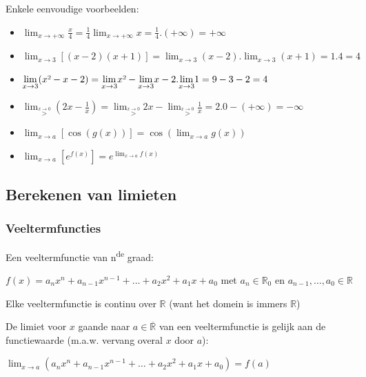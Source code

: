 Enkele eenvoudige voorbeelden:
\begin{itemize}
\item ${\displaystyle \lim_{x\to+\infty}}\frac{x}{4}=\frac{1}{4}{\displaystyle \lim_{x\to+\infty}}x=\frac{1}{4}.(+\infty)=+\infty$
\item ${\displaystyle \lim_{x\to3}}\left[(x-2)(x+1)\right]={\displaystyle \lim_{x\to3}}(x-2).{\displaystyle \lim_{x\to3}}(x+1)=1.4=4$
\item ${\displaystyle \lim_{x\to3}}(x\text{\texttwosuperior}-x-2)={\displaystyle \lim_{x\to3}}x\text{\texttwosuperior}-{\displaystyle \lim_{x\to3}}x-2.{\displaystyle \lim_{x\to3}}1=9-3-2=4$
\item ${\displaystyle \lim_{\overset{x\rightarrow0}{>}}}\left(2x-\frac{1}{x}\right)={\displaystyle \lim_{\overset{x\rightarrow0}{>}}}2x-{\displaystyle \lim_{\overset{x\rightarrow0}{>}}}\frac{1}{x}=2.0-\left(+\infty\right)=-\infty$
\item ${\displaystyle \lim_{x\to a}}\left[\cos\left(g(x)\right)\right]=\cos\left({\displaystyle \lim_{x\to a}}g(x)\right)$
\item ${\displaystyle \lim_{x\to a}}\left[e^{f(x)}\right]=e^{{\displaystyle \lim_{x\to a}}f(x)}$
\end{itemize}

\subsection{Berekenen van limieten}

\subsubsection{Veeltermfuncties}

Een veeltermfunctie van n\textsuperscript{de} graad:

$f(x)=a_{n}x^{n}+a_{n-1}x^{n-1}+\ldots+a_{2}x^{2}+a_{1}x+a_{0}$ met
$a_{n}\in\mathbb{R}_{0}$ en $a_{n-1},\ldots,a_{0}\in\mathbb{R}$




Elke veeltermfunctie is continu over $\mathbb{R}$ (want
het domein is immers $\mathbb{R}$)

De limiet voor $x$ gaande naar $a\in\overline{\mathbb{R}}$
van een veeltermfunctie is gelijk aan de functiewaarde (m.a.w. vervang
overal $x$ door $a$):

${\displaystyle \lim_{x\to a}}\left(a_{n}x^{n}+a_{n-1}x^{n-1}+\ldots+a_{2}x^{2}+a_{1}x+a_{0}\right)=f(a)$




